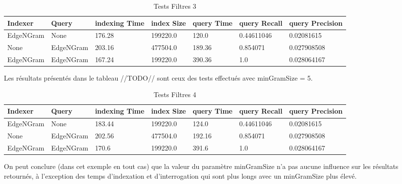 \begin{table}[H]
                \centering
                \begin{tabular}{|p{2cm}|p{2cm}|p{2cm}|p{2cm}|p{2cm}|p{2cm}|p{2cm}|}
                    \hline
                    \textbf{Indexer} & \textbf{Query} & \textbf{indexing Time} & \textbf{index Size} & \textbf{query Time} & \textbf{query Recall} & \textbf{query Precision}\\
                    \hline
EdgeNGram & None & 176.28 & 199220.0 & 120.0 & 0.44611046 & 0.02081615\\
		\hline
None & EdgeNGram & 203.16 & 477504.0 & 189.36 & 0.854071 & 0.027908508\\
		\hline
EdgeNGram & EdgeNGram & 167.24 & 199220.0 & 390.36 & 1.0 & 0.028064167\\
                    \hline
                \end{tabular}
                \caption{Tests Filtres 3}
                \label{tab:tests_filtres_3}
            \end{table}

Les résultats présentés dans le tableau //TODO// sont ceux des tests effectués avec minGramSize = 5.

\begin{table}[H]
                \centering
                \begin{tabular}{|p{2cm}|p{2cm}|p{2cm}|p{2cm}|p{2cm}|p{2cm}|p{2cm}|}
                    \hline
                    \textbf{Indexer} & \textbf{Query} & \textbf{indexing Time} & \textbf{index Size} & \textbf{query Time} & \textbf{query Recall} & \textbf{query Precision}\\
                    \hline
EdgeNGram & None & 183.44 & 199220.0 & 124.0 & 0.44611046 & 0.02081615\\
		\hline
None & EdgeNGram & 202.56 & 477504.0 & 192.16 & 0.854071 & 0.027908508\\
		\hline
EdgeNGram & EdgeNGram & 170.6 & 199220.0 & 391.6 & 1.0 & 0.028064167\\
                    \hline
                \end{tabular}
                \caption{Tests Filtres 4}
                \label{tab:tests_filtres_4}
            \end{table}

On peut conclure (dans cet exemple en tout cas) que la valeur du paramètre minGramSize n’a pas aucune influence sur les résultats retournés, à l’exception des temps d’indexation et d’interrogation qui sont plus longs avec un minGramSize plus élevé.

